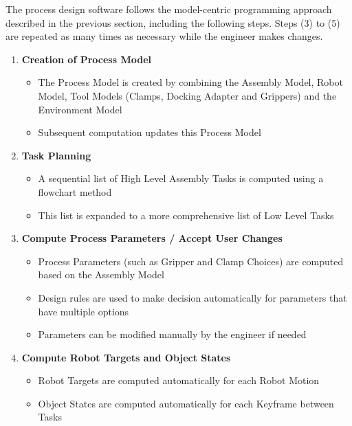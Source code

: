 The process design software follows the model-centric programming approach described in the previous section, including the following steps. Steps (3) to (5) are repeated as many times as necessary while the engineer makes changes.
\begin{enumerate}
	\item \textbf{Creation of Process Model}
	\begin{itemize}
		\item The Process Model is created by combining the Assembly Model, Robot Model, Tool Models (Clamps, Docking Adapter and Grippers) and the Environment Model 
		\item Subsequent computation updates this Process Model
	\end{itemize}

	\item \textbf{Task Planning}
	\begin{itemize}
		\item A sequential list of High Level Assembly Tasks is computed using a flowchart method 
		\item This list is expanded to a more comprehensive list of Low Level Tasks 
	\end{itemize}

	\item \textbf{Compute Process Parameters / Accept User Changes}
	\begin{itemize}
		\item Process Parameters (such as Gripper and Clamp Choices) are computed based on the Assembly Model 
		\item Design rules are used to make decision automatically for parameters that have multiple options
		\item Parameters can be modified manually by the engineer if needed
	\end{itemize}
	
	\item \textbf{Compute Robot Targets and Object States}
	\begin{itemize}
		\item Robot Targets are computed automatically for each Robot Motion\\
		\item Object States are computed automatically for each Keyframe between Tasks 
	\end{itemize}
	

\end{enumerate}
